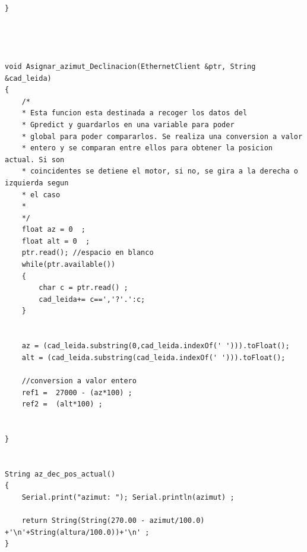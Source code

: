 \begin{appendices}
\begin{verbatim}
}




void Asignar_azimut_Declinacion(EthernetClient &ptr, String &cad_leida)
{
	/*
	* Esta funcion esta destinada a recoger los datos del 
	* Gpredict y guardarlos en una variable para poder 
	* global para poder compararlos. Se realiza una conversion a valor 
	* entero y se comparan entre ellos para obtener la posicion actual. Si son 
	* coincidentes se detiene el motor, si no, se gira a la derecha o izquierda segun 
	* el caso
	* 
	*/
	float az = 0  ;
	float alt = 0  ;
	ptr.read(); //espacio en blanco  
	while(ptr.available())
	{ 
		char c = ptr.read() ; 
		cad_leida+= c==','?'.':c;   
	}
	
	
	az = (cad_leida.substring(0,cad_leida.indexOf(' '))).toFloat();
	alt = (cad_leida.substring(cad_leida.indexOf(' '))).toFloat(); 
	
	//conversion a valor entero 
	ref1 =  27000 - (az*100) ; 
	ref2 =  (alt*100) ;  
	
	
}


String az_dec_pos_actual()
{
	Serial.print("azimut: "); Serial.println(azimut) ; 
	
	return String(String(270.00 - azimut/100.0) +'\n'+String(altura/100.0))+'\n' ; 
}

		\end{verbatim}

	 
	
\end{appendices}
	